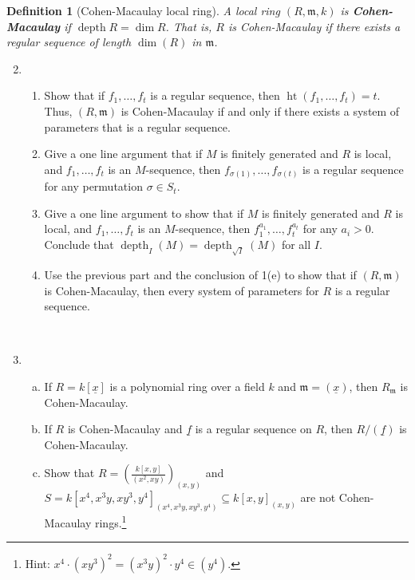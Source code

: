 \documentclass[11pt]{book}
\newtheorem{definition}[theorem]{Definition}
\numberwithin{equation}{section}
\numberwithin{theorem}{chapter}
\theoremstyle{definition}
\newtheorem*{basic properties}{Basic Properties}
\newtheorem*{Important Remark}{Important Remark}
\theoremstyle{remark}
\newcommand{\m}{\mathfrak{m}}
\newcommand{\height}{\operatorname{ht}}
\renewcommand{\dim}{\operatorname{dim}}
\newcommand{\depth}{\operatorname{depth}}
\renewcommand{\height}{\operatorname{ht}}
\begin{document}
\begin{definition}[Cohen-Macaulay local ring]
A local ring $(R,\m,k)$ is {\bf Cohen-Macaulay} if $\depth R = \dim R$. That is, $R$ is Cohen-Macaulay if there exists a regular sequence of length $\dim(R)$ in $\m$.
\end{definition}

\begin{enumerate}\setcounter{enumi}{1}
	\item \begin{enumerate}
		\item Show that if $f_1,\dots,f_t$ is a regular sequence, then $\height(f_1,\dots,f_t)=t$. Thus, $(R,\m)$ is Cohen-Macaulay if and only if there exists a system of parameters that is a regular sequence.
		\item Give a one line argument that if $M$ is finitely generated and $R$ is local, and $f_1,\dots,f_t$  is an $M$-sequence, then $f_{\sigma(1)},\dots,f_{\sigma(t)}$ is a regular sequence for any permutation $\sigma\in S_t$.
		\item Give a one line argument to show that if $M$ is finitely generated and $R$ is local, and $f_1,\dots,f_t$  is an $M$-sequence, then $f_1^{a_1},\dots,f_t^{a_t}$ for any $a_i>0$. Conclude that $\depth_I(M)=\depth_{\sqrt{I}}(M)$ for all $I$.
		\item Use the previous part and the conclusion of 1(e) to show that if $(R,\m)$ is Cohen-Macaulay, then every system of parameters for $R$ is a regular sequence.
	\end{enumerate}
	
	
	\
	
	\item 
	\begin{enumerate}[a)]
		\item If $R=k[\underline{x}]$ is a polynomial ring over a field $k$ and $\m = (\underline{x})$, then $R_\m$ is Cohen-Macaulay.
		
		
		
		\item If $R$ is Cohen-Macaulay and $\underline{f}$ is a regular sequence on $R$, then $R/(\underline{f})$ is Cohen-Macaulay.
		
		
		
		\item Show that $R = \left( \frac{k[x,y]}{(x^2,xy)} \right)_{(x,y)}$ and $S = k[x^4,x^3y,xy^3,y^4]_{(x^4,x^3y,xy^3,y^4)} \subseteq k[x,y]_{(x,y)}$ are not Cohen-Macaulay rings.\footnote{Hint: $x^4 \cdot (xy^3)^2 = (x^3y)^2 \cdot y^4 \in (y^4).$}
	\end{enumerate} 
	

\end{enumerate}
\end{document}
